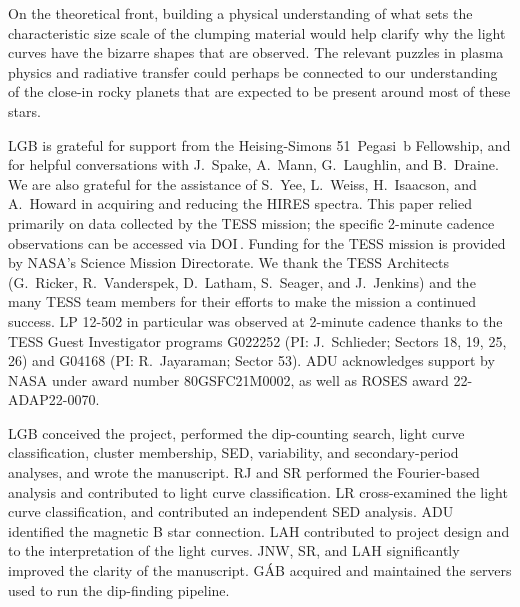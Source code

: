 \documentclass[11pt,twocolumn,tighten]{aastex63}
\begin{document}
On the theoretical front, building a physical understanding of what
sets the characteristic size scale of the clumping material would help
clarify why the light curves have the bizarre shapes that are
observed.  The relevant puzzles in plasma physics and radiative
transfer could perhaps be connected to our understanding of the
close-in rocky planets that are expected to be present around most of
these stars.



\acknowledgments
LGB is grateful for support from the Heising-Simons 51~Pegasi~b
Fellowship, and for helpful conversations with J.~Spake, A.~Mann,
G.~Laughlin, and B.~Draine.  
We are also grateful for the assistance of S.~Yee, L.~Weiss,
H.~Isaacson, and A.~Howard in acquiring and reducing the HIRES
spectra.
This paper relied primarily on data collected by the TESS mission; the
specific 2-minute cadence observations can be accessed via
DOI\,.
Funding for the TESS mission is provided by NASA’s Science Mission
Directorate.  
We thank the TESS Architects (G.~Ricker, R.~Vanderspek, D.~Latham,
S.~Seager, and J.~Jenkins) and the many TESS team members for their
efforts to make the mission a continued success. 
LP 12-502 in particular was observed at 2-minute cadence thanks to the
TESS Guest Investigator programs G022252 (PI: J.~Schlieder; Sectors
18, 19, 25, 26) and G04168 (PI: R.~Jayaraman; Sector 53). 
ADU acknowledges support by NASA under award number 80GSFC21M0002, as
well as ROSES award 22-ADAP22-0070.

LGB conceived the project, performed the dip-counting search, light curve classification, cluster membership, SED, variability, and secondary-period analyses, and wrote the manuscript.
RJ and SR performed the Fourier-based analysis and contributed to light curve classification.
LR cross-examined the light curve classification, and contributed an independent SED analysis.
ADU identified the magnetic B star connection.
LAH contributed to project design and to the interpretation of the light curves.
JNW, SR, and LAH significantly improved the clarity of the manuscript.
G\'AB acquired and maintained the servers used to run the dip-finding pipeline.

\end{document}
